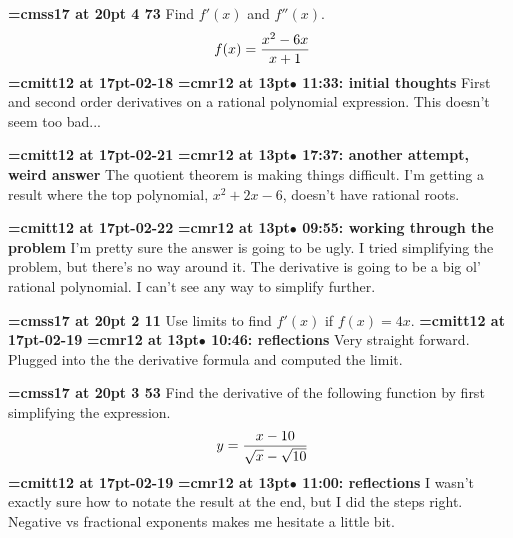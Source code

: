 {\medskip\noindent\bf\font\titlefont=cmss17 at 20pt 4 73}\medskip
Find $f'(x)$ and $f''(x)$.
$$\
f(x) = {x^2 - 6x \over x + 1}
$$
{\medskip\noindent\bf\font\titlefont=cmitt12 at 17pt-02-18}\medskip
{\smallskip\noindent\bf\font\titlefont=cmr12 at 13pt\titlefont $\bullet$ 11:33: initial thoughts}\smallskip
First and second order derivatives on a rational polynomial expression. This doesn't seem too bad...
\par

{\medskip\noindent\bf\font\titlefont=cmitt12 at 17pt-02-21}\medskip
{\smallskip\noindent\bf\font\titlefont=cmr12 at 13pt\titlefont $\bullet$ 17:37: another attempt, weird answer}\smallskip
The quotient theorem is making things difficult. I'm getting a result where the top polynomial, $x^2 + 2x - 6$, doesn't have rational roots. 
\par

{\medskip\noindent\bf\font\titlefont=cmitt12 at 17pt-02-22}\medskip
{\smallskip\noindent\bf\font\titlefont=cmr12 at 13pt\titlefont $\bullet$ 09:55: working through the problem}\smallskip
I'm pretty sure the answer is going to be ugly. I tried simplifying the problem, but there's no way around it. The derivative is going to be a big ol' rational polynomial. I can't see any way to simplify further.
\par

{\medskip\noindent\bf\font\titlefont=cmss17 at 20pt 2 11}\medskip
Use limits to find $f'(x)$ if $f(x) = 4x$.
{\medskip\noindent\bf\font\titlefont=cmitt12 at 17pt-02-19}\medskip
{\smallskip\noindent\bf\font\titlefont=cmr12 at 13pt\titlefont $\bullet$ 10:46: reflections}\smallskip
Very straight forward. Plugged into the the derivative formula and computed the limit.
\par

{\medskip\noindent\bf\font\titlefont=cmss17 at 20pt 3 53}\medskip
Find the derivative of the following function by first
simplifying the expression.
$$\
y = {x - 10 \over \sqrt{x} - \sqrt{10}}
$$
{\medskip\noindent\bf\font\titlefont=cmitt12 at 17pt-02-19}\medskip
{\smallskip\noindent\bf\font\titlefont=cmr12 at 13pt\titlefont $\bullet$ 11:00: reflections}\smallskip
I wasn't exactly sure how to notate the result at the end, but I did the steps right. Negative vs fractional exponents makes me hesitate a little bit.
\par

